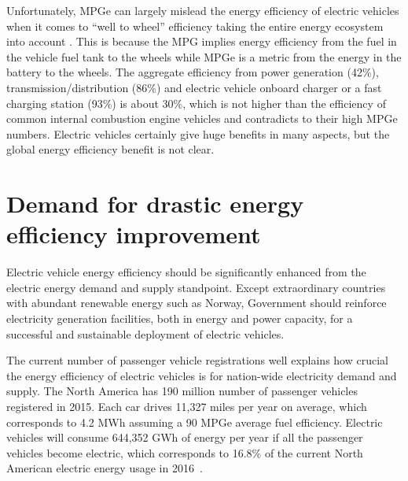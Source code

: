 \documentclass[journal]{IEEEtran}
\begin{document}
Unfortunately, MPGe can largely mislead the energy efficiency of electric vehicles when it comes to “well to wheel” efficiency taking the entire energy ecosystem into account  \cite{Campanari:JPS09}. This is because the MPG implies energy efficiency from the fuel in the vehicle fuel tank to the wheels while MPGe is a metric from the energy in the battery to the wheels. The aggregate efficiency from power generation (42\%), transmission/distribution (86\%) and electric vehicle onboard charger or a fast charging station (93\%) is about 30\%, which is not higher than the efficiency of common internal combustion engine vehicles \cite{Khaligh:TVT12} and contradicts to their high MPGe numbers. Electric vehicles certainly give huge benefits in many aspects, but the global energy efficiency benefit is not clear.


\section{Demand for drastic energy efficiency improvement}

Electric vehicle energy efficiency should be significantly enhanced from the electric energy demand and supply standpoint. Except extraordinary countries with abundant renewable energy such as Norway, Government should reinforce electricity generation facilities, both in energy and power capacity, for a successful and sustainable deployment of electric vehicles. 

The current number of passenger vehicle registrations well explains how crucial the energy efficiency of electric vehicles is for nation-wide electricity demand and supply. The North America has 190 million number of passenger vehicles registered in 2015. Each car drives 11,327 miles per year on average, which corresponds to 4.2 MWh assuming a 90 MPGe average fuel efficiency. Electric vehicles will consume 644,352 GWh of energy per year if all the passenger vehicles become electric, which corresponds to 16.8\% of the current North American electric energy usage in 2016~\cite{FHWA, EIA}. 
\end{document}

